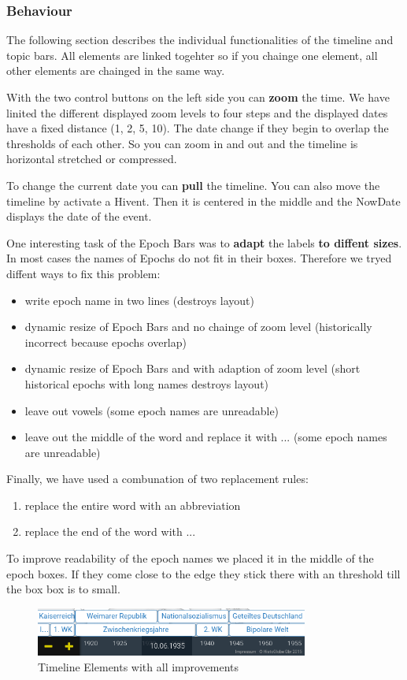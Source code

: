\subsubsection{Behaviour}
The following section describes the individual functionalities of the timeline and topic bars. All elements are linked togehter so if you chainge one element, all other elements are chainged in the same way.

With the two control buttons on the left side you can \textbf{zoom} the time. We have linited the different displayed zoom levels to four steps and the displayed dates have a fixed distance (1, 2, 5, 10). The date change if they begin to overlap the thresholds of each other. So you can zoom in and out and the timeline is horizontal stretched or compressed.

To change the current date you can \textbf{pull} the timeline. You can also move the timeline by activate a Hivent. Then it is centered in the middle and the NowDate displays the date of the event.

One interesting task of the Epoch Bars was to \textbf{adapt} the labels \textbf{to diffent sizes}. In most cases the names of Epochs do not fit in their boxes. Therefore we tryed diffent ways to fix this problem:

\begin{itemize}
	\item write epoch name in two lines (destroys layout)
	\item dynamic resize of Epoch Bars and no chainge of zoom level (historically incorrect because epochs overlap)
	\item dynamic resize of Epoch Bars and with adaption of zoom level (short historical epochs with long names destroys layout)
	\item leave out vowels (some epoch names are unreadable)
	\item leave out the middle of the word and replace it with ... (some epoch names are unreadable)
\end{itemize}

Finally, we have used a combunation of two replacement rules:

\begin{enumerate}
	\item replace the entire word with an abbreviation
	\item replace the end of the word with ...
\end{enumerate}

To improve readability of the epoch names we placed it in the middle of the epoch boxes. If they come close to the edge they stick there with an threshold till the box box is to small.

\begin{figure}[H]
	\centering
	\includegraphics[width=0.8\textwidth]{graphics/timeline_elements2.png}
	\caption{Timeline Elements with all improvements}
	\label{fig:Timeline_Elements2}
\end{figure}